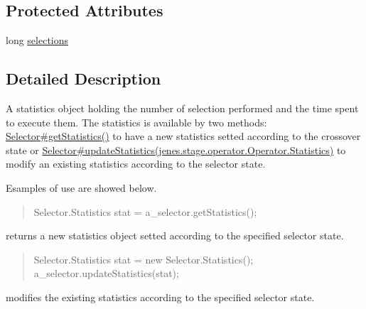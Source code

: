 \subsection*{Protected Attributes}
\begin{DoxyCompactItemize}
\item 
long \hyperlink{classjenes_1_1stage_1_1operator_1_1_selector_3_01_t_01extends_01_chromosome_01_4_1_1_statistics_a8308f3f0177bfe79fcbf46bd4ac93cc4}{selections}
\end{DoxyCompactItemize}


\subsection{Detailed Description}
A statistics object holding the number of selection performed and the time spent to execute them. The statistics is available by two methods\-: \hyperlink{}{Selector\#get\-Statistics()} to have a new statistics setted according to the crossover state or \hyperlink{}{Selector\#update\-Statistics(jenes.\-stage.\-operator.\-Operator.\-Statistics)} to modify an existing statistics according to the selector state. 

Esamples of use are showed below. 

\begin{quotation}

\begin{DoxyPre}
Selector.Statistics stat = a\_selector.getStatistics();
\end{DoxyPre}
\end{quotation}


returns a new statistics object setted according to the specified selector state. 

\begin{quotation}

\begin{DoxyPre}
Selector.Statistics stat = new Selector.Statistics();
a\_selector.updateStatistics(stat);
\end{DoxyPre}
\end{quotation}


modifies the existing statistics according to the specified selector state. 

